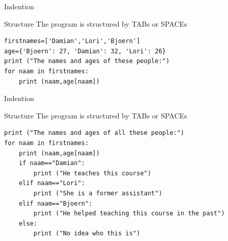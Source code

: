 {
\begin{frame}[plain]
\end{frame}
}

\begin{frame}[fragile]{Indention}
\begin{block}{Structure}
The program is structured by TABs or SPACEs
\end{block}
\begin{lstlisting}
firstnames=['Damian','Lori','Bjoern']
age={'Bjoern': 27, 'Damian': 32, 'Lori': 26}
print ("The names and ages of these people:")
for naam in firstnames:
    print (naam,age[naam])
\end{lstlisting}
\end{frame}





\begin{frame}[fragile]{Indention}
\begin{block}{Structure}
The program is structured by TABs or SPACEs
\end{block}
\begin{lstlisting}
print ("The names and ages of all these people:")
for naam in firstnames:
    print (naam,age[naam])
    if naam=="Damian":
        print ("He teaches this course")
    elif naam=="Lori":
        print ("She is a former assistant")
    elif naam=="Bjoern":
        print ("He helped teaching this course in the past")
    else:
        print ("No idea who this is")
\end{lstlisting}
\end{frame}


